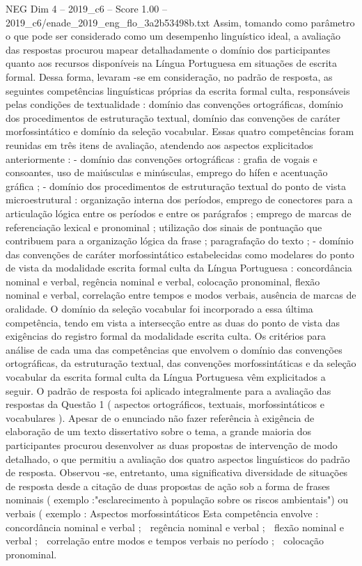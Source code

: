 \begin{textsample}{NEG Dim 4 – 2019\_c6 – Score 1.00 – 2019\_c6/enade\_2019\_eng\_flo\_3a2b53498b.txt}
Assim, tomando como parâmetro o que pode ser considerado como um desempenho linguístico ideal, a avaliação das respostas procurou mapear detalhadamente o domínio dos participantes quanto aos recursos disponíveis na Língua Portuguesa em situações de escrita formal.
Dessa forma, levaram -se em consideração, no padrão de resposta, as seguintes competências linguísticas próprias da escrita formal culta, responsáveis pelas condições de textualidade : domínio das convenções ortográficas, domínio dos procedimentos de estruturação textual, domínio das convenções de caráter morfossintático e domínio da seleção vocabular.
Essas quatro competências foram reunidas em três itens de avaliação, atendendo aos aspectos explicitados anteriormente : - domínio das convenções ortográficas : grafia de vogais e consoantes, uso de maiúsculas e minúsculas, emprego do hífen e acentuação gráfica ; - domínio dos procedimentos de estruturação textual do ponto de vista microestrutural : organização interna dos períodos, emprego de conectores para a articulação lógica entre os períodos e entre os parágrafos ; emprego de marcas de referenciação lexical e pronominal ; utilização dos sinais de pontuação que contribuem para a organização lógica da frase ; paragrafação do texto ; - domínio das convenções de caráter morfossintático estabelecidas como modelares do ponto de vista da modalidade escrita formal culta da Língua Portuguesa : concordância nominal e verbal, regência nominal e verbal, colocação pronominal, flexão nominal e verbal, correlação entre tempos e modos verbais, ausência de marcas de oralidade.
O domínio da seleção vocabular foi incorporado a essa última competência, tendo em vista a intersecção entre as duas do ponto de vista das exigências do registro formal da modalidade escrita culta.
Os critérios para análise de cada uma das competências que envolvem o domínio das convenções ortográficas, da estruturação textual, das convenções morfossintáticas e da seleção vocabular da escrita formal culta da Língua Portuguesa vêm explicitados a seguir.
O padrão de resposta foi aplicado integralmente para a avaliação das respostas da Questão 1 ( aspectos ortográficos, textuais, morfossintáticos e vocabulares ).
Apesar de o enunciado não fazer referência à exigência de elaboração de um texto dissertativo sobre o tema, a grande maioria dos participantes procurou desenvolver as duas propostas de intervenção de modo detalhado, o que permitiu a avaliação dos quatro aspectos linguísticos do padrão de resposta.
Observou -se, entretanto, uma significativa diversidade de situações de resposta desde a citação de duas propostas de ação sob a forma de frases nominais ( exemplo :"esclarecimento à população sobre os riscos ambientais") ou verbais ( exemplo : Aspectos morfossintáticos Esta competência envolve :  concordância nominal e verbal ;  regência nominal e verbal ;  flexão nominal e verbal ;  correlação entre modos e tempos verbais no período ;  colocação pronominal.

\end{textsample}
